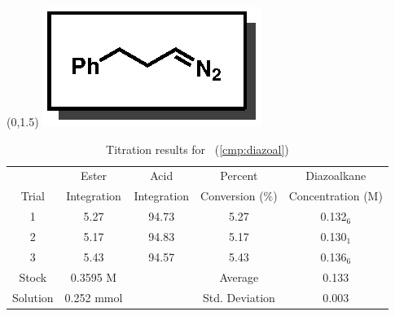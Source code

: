 \begin{singlespace}
\begin{table}[htbp]
\begin{textblock}{1}(0,1.5)
\includegraphics[scale=0.8]{chp_asymmetric/images/diazoal}
\end{textblock}
\flushright
{\small
\begin{tabular}{ccccc} 
\toprule
&Ester&Acid&Percent&Diazoalkane\\
Trial&Integration&Integration&Conversion (\%)&Concentration (M) \\ 
\midrule
1 & 5.27 & 94.73 & 5.27 & 0.132$_6$ \\
2 & 5.17 & 94.83 & 5.17 & 0.130$_1$ \\
3 & 5.43 & 94.57 & 5.43 & 0.136$_6$ \\
\midrule
Stock & 0.3595 M & & Average & 0.133\\
Solution & 0.252 mmol & & Std. Deviation & 0.003 \\
\bottomrule
\end{tabular}
\caption{Titration results for \CMPdiazoal~(\ref{cmp:diazoal})}
}
\end{table}
\end{singlespace}

